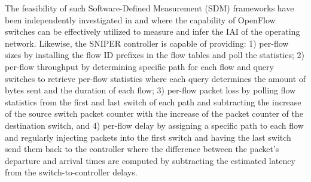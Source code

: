 
The feasibility of such Software-Defined Measurement (SDM) frameworks
have been independently investigated in \cite{IF14iSTAMP:2014} and
\cite{Adrichen:2014} where the capability of OpenFlow switches can be
effectively utilized to measure and infer the IAI of the operating
network. Likewise, the SNIPER controller is capable of providing: 1)
per-flow sizes \cite{IF14iSTAMP:2014} by installing the flow ID
prefixes in the flow tables and poll the statistics; 2) per-flow
throughput \cite{Adrichen:2014} by determining specific path for each
flow and query switches to retrieve per-flow statistics where each
query determines the amount of bytes sent and the duration of each
flow; 3) per-flow packet loss \cite{Adrichen:2014} by polling flow
statistics from the first and last switch of each path and subtracting
the increase of the source switch packet counter with the increase of
the packet counter of the destination switch, and 4) per-flow delay
\cite{Adrichen:2014} by assigning a specific path to each flow and
regularly injecting packets into the first switch and having the last
switch send them back to the controller where the difference between
the packet's departure and arrival times are computed by subtracting
the estimated latency from the switch-to-controller delays. 

